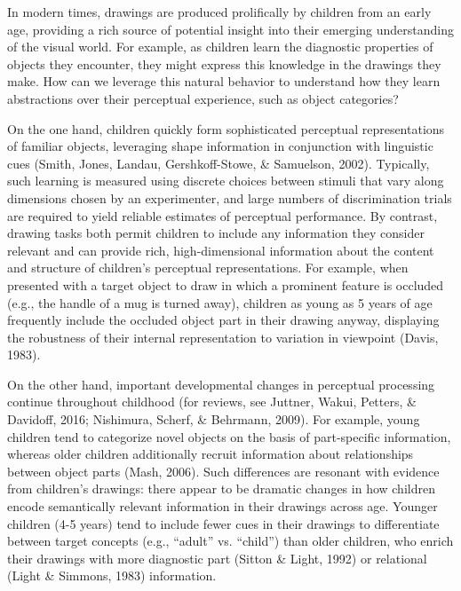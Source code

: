 \documentclass[10pt, letterpaper]{article}
\begin{document}
In modern times, drawings are produced prolifically by children from an
early age, providing a rich source of potential insight into their
emerging understanding of the visual world. For example, as children
learn the diagnostic properties of objects they encounter, they might
express this knowledge in the drawings they make. How can we leverage
this natural behavior to understand how they learn abstractions over
their perceptual experience, such as object categories?

On the one hand, children quickly form sophisticated perceptual
representations of familiar objects, leveraging shape information in
conjunction with linguistic cues (Smith, Jones, Landau, Gershkoff-Stowe,
\& Samuelson, 2002). Typically, such learning is measured using discrete
choices between stimuli that vary along dimensions chosen by an
experimenter, and large numbers of discrimination trials are required to
yield reliable estimates of perceptual performance. By contrast, drawing
tasks both permit children to include any information they consider
relevant and can provide rich, high-dimensional information about the
content and structure of children's perceptual representations. For
example, when presented with a target object to draw in which a
prominent feature is occluded (e.g., the handle of a mug is turned
away), children as young as 5 years of age frequently include the
occluded object part in their drawing anyway, displaying the robustness
of their internal representation to variation in viewpoint (Davis,
1983).

On the other hand, important developmental changes in perceptual
processing continue throughout childhood (for reviews, see Juttner,
Wakui, Petters, \& Davidoff, 2016; Nishimura, Scherf, \& Behrmann,
2009). For example, young children tend to categorize novel objects on
the basis of part-specific information, whereas older children
additionally recruit information about relationships between object
parts (Mash, 2006). Such differences are resonant with evidence from
children's drawings: there appear to be dramatic changes in how children
encode semantically relevant information in their drawings across age.
Younger children (4-5 years) tend to include fewer cues in their
drawings to differentiate between target concepts (e.g., ``adult'' vs.
``child'') than older children, who enrich their drawings with more
diagnostic part (Sitton \& Light, 1992) or relational (Light \& Simmons,
1983) information.
\end{document}
